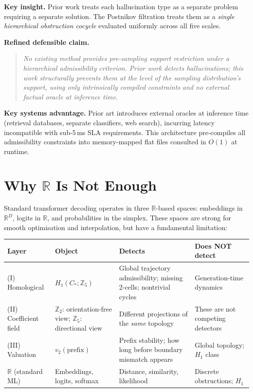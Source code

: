 \documentclass[11pt,a4paper]{article}
\begin{document}
\noindent\textbf{Key insight.}
Prior work treats each hallucination type as a separate problem
requiring a separate solution.
The Postnikov filtration treats them as a \emph{single hierarchical
obstruction cocycle} evaluated uniformly across all five scales.

\medskip\noindent\textbf{Refined defensible claim.}
\begin{quote}
\emph{No existing method provides pre-sampling support restriction
under a hierarchical admissibility criterion.
Prior work detects hallucinations; this work structurally prevents
them at the level of the sampling distribution's support, using only
intrinsically compiled constraints and no external factual oracle
at inference time.}
\end{quote}

\medskip\noindent\textbf{Key systems advantage.}
Prior art introduces external oracles at inference time
(retrieval databases, separate classifiers, web search),
incurring latency incompatible with sub-5\,ms SLA requirements.
This architecture pre-compiles all admissibility constraints into
memory-mapped flat files consulted in $O(1)$ at runtime.

\section{Why $\mathbb{R}$ Is Not Enough}
\label{sec:why_r}

Standard transformer decoding operates in three $\mathbb{R}$-based spaces:
embeddings in $\mathbb{R}^D$, logits in $\mathbb{R}$,
and probabilities in the simplex.
These spaces are strong for smooth optimisation and interpolation,
but have a fundamental limitation:

\begin{center}
\renewcommand{\arraystretch}{1.3}\small
\begin{tabular}{p{2.8cm}p{3.5cm}p{3.5cm}p{2.5cm}}
\toprule
\textbf{Layer} & \textbf{Object} & \textbf{Detects} & \textbf{Does NOT detect} \\
\midrule
(I) Homological &
  $H_1(C_*;\mathbb{Z}_5)$ &
  Global trajectory admissibility;
  missing 2-cells; nontrivial cycles &
  Generation-time dynamics \\
(II) Coefficient field &
  $\mathbb{Z}_2$: orientation-free view;
  $\mathbb{Z}_5$: directional view &
  Different projections of the
  \emph{same} topology &
  These are not competing detectors \\
(III) Valuation &
  $v_2(\text{prefix})$ &
  Prefix stability; how long before
  boundary mismatch appears &
  Global topology; $H_1$ class \\
\midrule
$\mathbb{R}$ (standard ML) &
  Embeddings, logits, softmax &
  Distance, similarity, likelihood &
  Discrete obstructions; $H_1$ \\
\bottomrule
\end{tabular}
\end{center}
\end{document}
